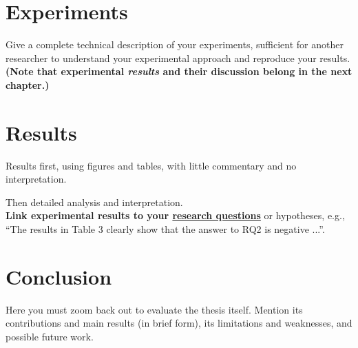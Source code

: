 \documentclass[a4paper,12pt]{Classes/RoboticsLaTeX}
\begin{document}
	\chapter{Experiments}
	\label{chap:experiments}
	
	Give a complete technical description of your experiments, sufficient for another researcher to understand your experimental approach and reproduce your results. \\
		
	\noindent \textbf{(Note that experimental \textit{results} and their discussion belong in the next chapter.)} 
	
	\chapter{Results}
	\label{chap:results}
	
	Results first, using figures and tables, with little commentary and no interpretation.
	
	\noindent Then detailed analysis and interpretation.\\
	
	\textbf{Link experimental results to your \underline{research questions}} or hypotheses, e.g., ``The results in Table 3 clearly show that the answer to RQ2 is negative ...''.
	
	\chapter{Conclusion}
	\label{chap:conclusion}
	
	Here you must zoom back out to evaluate the thesis itself. Mention its contributions and main results (in brief form), its limitations and weaknesses, and possible future work.
	
	 
	\renewcommand{\bibname}{References}           %
	
	
	
	
\end{document}
